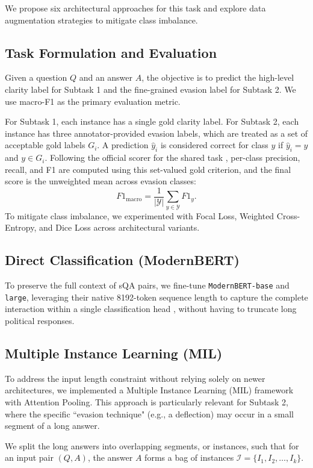 \documentclass[11pt]{article}
\begin{document}
We propose six architectural approaches for this task and explore data augmentation strategies to mitigate class imbalance.

\subsection{Task Formulation and Evaluation}
Given a question $Q$ and an answer $A$, the objective is to predict the high-level clarity label for Subtask 1 and the fine-grained evasion label for Subtask 2. We use macro-F1 as the primary evaluation metric.

For Subtask 1, each instance has a single gold clarity label. For Subtask 2, each instance has three annotator-provided evasion labels, which are treated as a set of acceptable gold labels $G_i$. A prediction $\hat{y}_i$ is considered correct for class $y$ if $\hat{y}_i = y$ and $y \in G_i$. Following the official scorer for the shared task \citep{b10}, per-class precision, recall, and F1 are computed using this set-valued gold criterion, and the final score is the unweighted mean across evasion classes:
\[
F1_{\text{macro}} = \frac{1}{|\mathcal{Y}|}\sum_{y \in \mathcal{Y}} F1_y.
\]
To mitigate class imbalance, we experimented with Focal Loss, Weighted Cross-Entropy, and Dice Loss across architectural variants.

\subsection{Direct Classification (ModernBERT)}
To preserve the full context of sQA pairs, we fine-tune \texttt{ModernBERT-base} and \texttt{large}, leveraging their native 8192-token sequence length to capture the complete interaction within a single classification head \citep{b8}, without having to truncate long political responses.

\subsection{Multiple Instance Learning (MIL)}
To address the input length constraint without relying solely on newer architectures, we implemented a Multiple Instance Learning (MIL) framework with Attention Pooling. This approach is particularly relevant for Subtask 2, where the specific ``evasion technique" (e.g., a deflection) may occur in a small segment of a long answer.

We split the long answers into overlapping segments, or instances, such that for an input pair $(Q, A)$, the answer $A$ forms a bag of instances $\mathcal{I} = \{I_1, I_2, \dots, I_k\}$.
\end{document}
